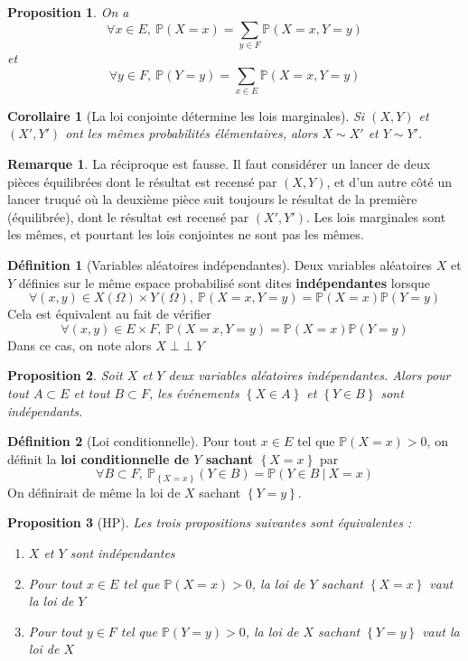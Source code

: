 \documentclass[french]{book}
\renewcommand{\P}{\mathbb{P}}
\theoremstyle{plain}
\newtheorem{prop}{Proposition}[chapter]
\newtheorem{cor}{Corollaire}[chapter]
\theoremstyle{definition}
\newtheorem{dfn}{Définition}[chapter]
\newtheorem{rmq}{Remarque}[chapter]
\theoremstyle{remark}
\DeclareMathOperator{\ind}{\perp \!\!\! \perp}
\begin{document}
\begin{prop}
	On a $$\forall x \in E, \ \P(X=x)=\sum_{y\in F}\P(X=x,Y=y)$$ et $$\forall y \in F, \ \P(Y=y)=\sum_{x\in E}\P(X=x,Y=y)$$
\end{prop}
\begin{cor}[La loi conjointe détermine les lois marginales]
	Si $(X,Y)$ et $(X',Y')$ ont les mêmes probabilités élémentaires, alors $X\sim X'$ et $Y\sim Y'$.
\end{cor}
\begin{rmq} La réciproque est fausse. Il faut considérer un lancer de deux pièces équilibrées dont le résultat est recensé par $(X,Y)$, et d'un autre côté un lancer truqué où la deuxième pièce suit toujours le résultat de la première (équilibrée), dont le résultat est recensé par $(X',Y')$. Les lois marginales sont les mêmes, et pourtant les lois conjointes ne sont pas les mêmes. \end{rmq}
\begin{dfn}[Variables aléatoires indépendantes]
	Deux variables aléatoires $X$ et $Y$ définies sur le même espace probabilisé sont dites \textbf{indépendantes} lorsque $$\forall (x,y)\in X(\Omega)\times Y(\Omega), \ \P(X=x,Y=y)=\P(X=x)\P(Y=y)$$ Cela est équivalent au fait de vérifier $$\forall (x,y)\in E\times F, \ \P(X=x,Y=y)=\P(X=x)\P(Y=y)$$ Dans ce cas, on note alors $X\ind Y$
\end{dfn}
\begin{prop}
	Soit $X$ et $Y$ deux variables aléatoires indépendantes. Alors pour tout $A\subset E$ et tout $B\subset F$, les événements $\left\{X\in A\right\}$ et $\left\{Y\in B\right\}$ sont indépendants.
\end{prop}
\begin{dfn}[Loi conditionnelle]
	Pour tout $x\in E$ tel que $\P(X=x)>0$, on définit la \textbf{loi conditionnelle de $Y$ sachant $\left\{X=x\right\}$} par $$\forall B\subset F, \ \P_{\left\{X=x\right\}}(Y\in B)=\P(Y\in B \ | \ X=x)$$ On définirait de même la loi de $X$ sachant $\left\{Y=y\right\}$.
\end{dfn}
\begin{prop}[HP]
	Les trois propositions suivantes sont équivalentes :
	\begin{enumerate}
		\item $X$ et $Y$ sont indépendantes
		\item Pour tout $x\in E$ tel que $\P(X=x)>0$, la loi de $Y$ sachant $\left\{X=x\right\}$ vaut la loi de $Y$
		\item Pour tout $y\in F$ tel que $\P(Y=y)>0$, la loi de $X$ sachant $\left\{Y=y\right\}$ vaut la loi de $X$
	\end{enumerate}
\end{prop}
\end{document}
